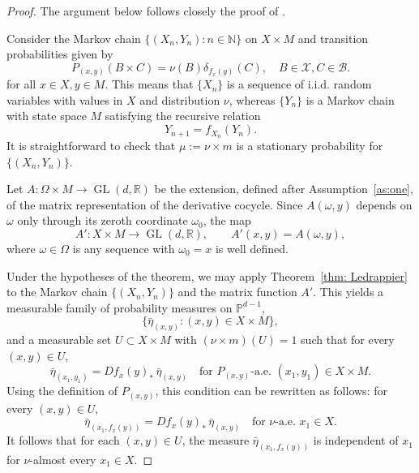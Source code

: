 \documentclass[a4paper,12pt,reqno]{amsart}
\numberwithin{equation}{section}
\newcommand{\cal}{\mathcal}
\newcommand{\BB}{{\cal B}}
\newcommand{\XX}{{\cal X}}
\newcommand{\Nn}{{\mathbb{N}}}
\newcommand{\Rr}{{\mathbb{R}}}
\begin{document}
\begin{proof}
The argument below follows closely the proof of \cite[Theorem 1]{carverhill1987furstenberg}.

Consider the Markov chain $\{(X_n,Y_n) \colon n \in \Nn\}$ on $X \times M$ and transition probabilities given by
\[
P_{(x,y)}(B \times C) = 	\nu(B) \delta_{f_x(y)}(C), \quad  B \in \XX, C \in \BB.
\]
for all $x \in X, y \in M$.
This means that $\{X_n\}$ is a sequence of i.i.d. random variables with values in $X$ and distribution $\nu$, whereas $\{Y_n\}$ is a Markov chain with state space $M$ satisfying the recursive relation   
\[
Y_{n+1}=f_{X_n}(Y_n).
\]
It is straightforward to check that $\mu:=\nu \times m$ is a stationary probability for $\{(X_n,Y_n)\}$.

Let $A\colon\Omega\times M\to\operatorname{GL}(d,\Rr)$ be the extension, defined after Assumption~\ref{as:one}, of the matrix representation of the derivative cocycle. Since $A(\omega,y)$ depends on $\omega$ only through its zeroth coordinate $\omega_0$, the map
\[
A' \colon X\times M\to\operatorname{GL}(d,\Rr),
\qquad
A'(x,y)=A(\omega,y),
\]
where $\omega\in\Omega$ is any sequence with $\omega_0=x$ is well defined.

Under the hypotheses of the theorem, we may apply Theorem~\ref{thm: Ledrappier}
to the Markov chain $\{(X_n,Y_n)\}$ and the matrix function $A'$. This yields a measurable family of probability measures on $\mathbb{P}^{d-1}$,
\[
\{\bar{\eta}_{(x,y)} : (x,y) \in X \times M\},
\]
and a measurable set $U \subset X \times M$ with $(\nu \times m)(U)=1$ such that for every $(x,y) \in U$,
\[
\bar{\eta}_{(x_1,y_1)}
=
Df_x(y)_{*}\,\bar{\eta}_{(x,y)}
\quad
\text{for $P_{(x,y)}$-a.e.\ $(x_1,y_1) \in X \times M$.}
\]
Using the definition of $P_{(x,y)}$, this condition can be rewritten as follows:
for every $(x,y) \in U$,
\begin{equation}
\label{eqn: 1}
\bar{\eta}_{(x_1,f_x(y))}
=
Df_x(y)_{*}\,\bar{\eta}_{(x,y)}
\quad
\text{for $\nu$-a.e.\ $x_1 \in X$.}
\end{equation}
It follows that for each $(x,y) \in U$, the measure $\bar{\eta}_{(x_1,f_x(y))}$ is independent of $x_1$ for $\nu$-almost every $x_1 \in X$.


\end{proof}
\end{document}
